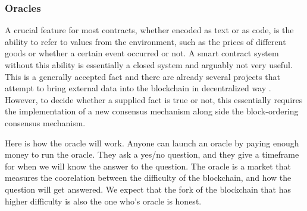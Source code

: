 \documentclass[a4paper, 10pt, conference]{ieeeconf}      %
\begin{document}
\begin{draft}




\subsubsection{Oracles}
A crucial feature for most contracts, whether encoded as text or as code, is the ability to refer to values from the environment, such as the prices of different goods or whether a certain event occurred or not. A smart contract system without this ability is essentially a closed system and arguably not very useful. This is a generally accepted fact and there are already several projects that attempt to bring external data into the blockchain in decentralized way \cite{augur}. However, to decide whether a supplied fact is true or not, this essentially requires the implementation of a new consensus mechanism along side the block-ordering consensus mechanism.


Here is how the oracle will work. Anyone can launch an oracle by paying enough money to run the oracle. They ask a yes/no question, and they give a timeframe for when we will know the answer to the question.
The oracle is a market that measures the coorelation between the difficulty of the blockchain, and how the question will get answered. We expect that the fork of the blockchain that has higher difficulty is also the one who's oracle is honest.


\end{draft}
\end{document}
